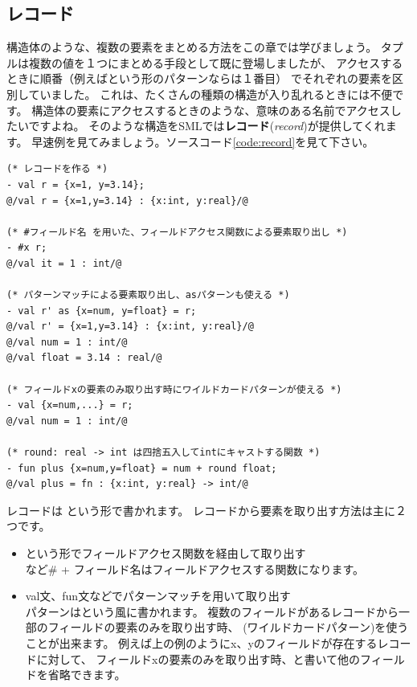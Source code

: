 \documentclass[11pt,a4paper]{jarticle}
\begin{document}
\subsection{レコード}
\label{sec:record}
構造体のような、複数の要素をまとめる方法をこの章では学びましょう。
タプルは複数の値を１つにまとめる手段として既に登場しましたが、
アクセスするときに順番（例えばという形のパターンならは１番目）
でそれぞれの要素を区別していました。
これは、たくさんの種類の構造が入り乱れるときには不便です。
構造体の要素にアクセスするときのような、意味のある名前でアクセスしたいですよね。
そのような構造をSMLでは\textbf{レコード}(\textit{record})が提供してくれます。
早速例を見てみましょう。ソースコード\ref{code:record}を見て下さい。

\begin{lstlisting}[caption=レコードの例,label=code:record]
(* レコードを作る *)
- val r = {x=1, y=3.14};
@/val r = {x=1,y=3.14} : {x:int, y:real}/@

(* #フィールド名 を用いた、フィールドアクセス関数による要素取り出し *)
- #x r;
@/val it = 1 : int/@

(* パターンマッチによる要素取り出し、asパターンも使える *)
- val r' as {x=num, y=float} = r;
@/val r' = {x=1,y=3.14} : {x:int, y:real}/@
@/val num = 1 : int/@
@/val float = 3.14 : real/@

(* フィールドxの要素のみ取り出す時にワイルドカードパターンが使える *)
- val {x=num,...} = r;
@/val num = 1 : int/@

(* round: real -> int は四捨五入してintにキャストする関数 *)
- fun plus {x=num,y=float} = num + round float;
@/val plus = fn : {x:int, y:real} -> int/@
\end{lstlisting}

レコードは
という形で書かれます。
レコードから要素を取り出す方法は主に２つです。
\begin{itemize}
\item {} という形でフィールドアクセス関数を経由して取り出す \\
   など\# + フィールド名はフィールドアクセスする関数になります。
\item val文、fun文などでパターンマッチを用いて取り出す \\
  パターンはという風に書かれます。
  複数のフィールドがあるレコードから一部のフィールドの要素のみを取り出す時、
  (ワイルドカードパターン)を使うことが出来ます。
  例えば上の例のようにx、yのフィールドが存在するレコードに対して、
  フィールドxの要素のみを取り出す時、と書いて他のフィールドを省略できます。
\end{itemize}
\end{document}
